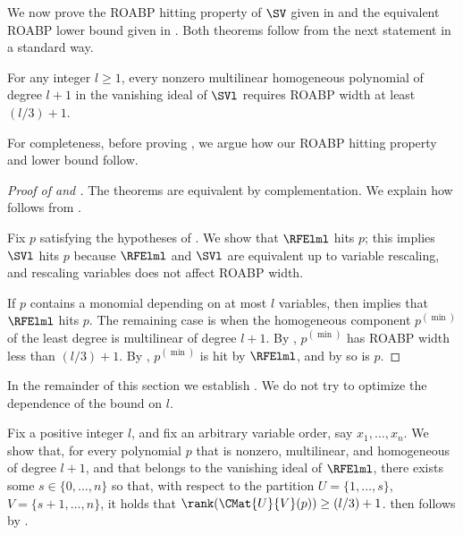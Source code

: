 We now prove the ROABP hitting property of $\SV$ given in  and the equivalent ROABP lower bound given in . Both theorems follow from the next statement in a standard way. 
\begin{theorem}
  \label{thm.application.roabp.hardpart}
  For any integer $l \ge 1$,
  every nonzero multilinear homogeneous polynomial of degree $l+1$ in the vanishing ideal of $\SVl$ requires ROABP width at least $(l/3)+1$.
\end{theorem} 
For completeness, before proving , we argue how our ROABP hitting property and lower bound follow.
\begin{proof}[Proof of  and ]
  The theorems are equivalent by complementation. We explain how  follows from .

  \def\pdn{p^{(\min)}}
  Fix \(p\) satisfying the hypotheses of .
  We show that \(\RFElml\) hits \(p\);
  this implies \(\SVl\) hits \(p\) because \(\RFElml\) and \(\SVl\) are
  equivalent up to variable rescaling, and rescaling variables does not affect
  ROABP width.

  If $p$ contains a monomial depending on at most $l$ variables, then  implies that $\RFElml$ hits $p$. The remaining case is when the homogeneous component $\pdn$ of the least degree is multilinear of degree $l+1$. By , $\pdn$ has ROABP width less than $(l/3)+1$. By , $\pdn$ is hit by $\RFElml$, and by  so is $p$.
\end{proof}

In the remainder of this section we establish
. We do not try to optimize the dependence of the bound on $l$.

Fix a positive integer \(l\),
and fix an arbitrary variable order, say \(x_1,\ldots,x_n\).
We show that, for every polynomial \(p\) that is nonzero, multilinear, and homogeneous of
degree \(l+1\),
and that belongs to the vanishing ideal of \(\RFElml\),
there exists some \(s\in\{0,\ldots,n\}\)
so that,
with respect to the partition
\(U=\{1,\ldots,s\}\), \(V = \{{s+1},\ldots,n\}\),
it holds that \(\rank(\CMat{U}{V}(p)) \ge (l/3)+1\).
 then follows by
.

